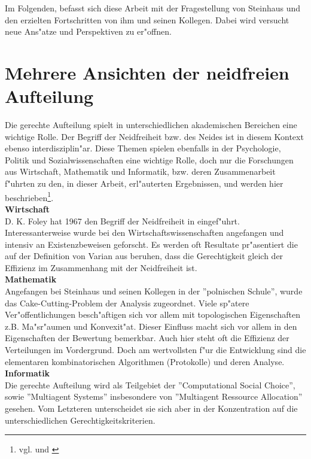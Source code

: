 \documentclass[11pt, a4paper, twoside]{article}
\numberwithin{equation}{section}
\begin{document}
Im Folgenden, befasst sich diese Arbeit mit der Fragestellung von Steinhaus und den erzielten Fortschritten von ihm und seinen Kollegen. Dabei wird versucht neue Ans"atze und Perspektiven zu er"offnen.
\newpage
\section{Mehrere Ansichten der neidfreien Aufteilung}
Die gerechte Aufteilung spielt in unterschiedlichen akademischen Bereichen eine wichtige Rolle. Der Begriff der Neidfreiheit bzw. des Neides ist in diesem Kontext ebenso interdisziplin"ar. Diese Themen spielen ebenfalls in der Psychologie, Politik und Sozialwissenschaften eine wichtige Rolle, doch nur die Forschungen aus Wirtschaft, Mathematik und Informatik, bzw. deren Zusammenarbeit f"uhrten zu den, in dieser Arbeit, erl"auterten Ergebnissen, und werden hier beschrieben\footnote{vgl. \cite{36} und \cite{53}}.\\
\newline
\textbf{Wirtschaft}\\
D. K. Foley hat 1967 den Begriff der Neidfreiheit in \cite{8} eingef"uhrt. 
Interessanterweise wurde bei den Wirtschaftswissenschaften angefangen und intensiv an Existenzbeweisen geforscht. Es werden oft Resultate pr"asentiert die auf der Definition von Varian aus \cite{52} beruhen, dass die Gerechtigkeit gleich der Effizienz im Zusammenhang mit der Neidfreiheit ist.\\
\newline
\textbf{Mathematik}\\
Angefangen bei Steinhaus und seinen Kollegen in der ''polnischen Schule'', wurde das Cake-Cutting-Problem der Analysis zugeordnet. Viele sp"atere Ver"offentlichungen besch"aftigen sich vor allem mit topologischen Eigenschaften z.B. Ma"sr"aumen und Konvexit"at. Dieser Einfluss macht sich vor allem in den Eigenschaften der Bewertung bemerkbar. Auch hier steht  oft die Effizienz der Verteilungen im Vordergrund. Doch am wertvollsten f"ur die Entwicklung sind die elementaren kombinatorischen Algorithmen (Protokolle) und deren Analyse.\\
\newline
\textbf{Informatik}\\
Die gerechte Aufteilung wird als Teilgebiet der ''Computational Social Choice'', sowie ''Multiagent Systems'' insbesondere von ''Multiagent Ressource Allocation'' gesehen. Vom Letzteren unterscheidet sie sich aber in der Konzentration auf die unterschiedlichen Gerechtigkeitskriterien.\\
\end{document}
